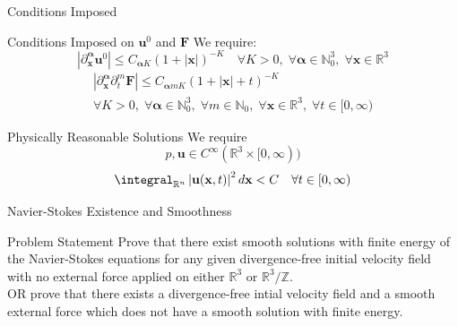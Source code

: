 \documentclass[handout]{beamer}
\newcommand{\Real}{\mathbb{R}}
\newcommand{\Integer}{\mathbb{Z}}
\newcommand{\Natural}{\mathbb{N}}
\begin{document}
  \begin{frame}{Conditions Imposed}
      \linespread{0.8}
      \pause
      \begin{block}{Conditions Imposed on $\mathbf{u}^0$ and $\mathbf{F}$}
          We require:
          $$
          \left| \partial^{\boldsymbol{\alpha}}_{\mathbf{x}} \mathbf{u}^0
          \right| \le
          C_{\boldsymbol{\alpha}K} \left(1 + \left|\mathbf{x}\right|\right)^{-K} \quad
          \forall K > 0, \; \forall \boldsymbol{\alpha} \in \Natural_0^3, \;
          \forall \mathbf{x} \in \Real^3
          $$\pause
          \begin{multline*}
          \left| \partial^{\boldsymbol{\alpha}}_{\mathbf{x}}
          \partial^m_t \mathbf{F}
          \right| \le
          C_{\boldsymbol{\alpha}mK} \left(1 + \left|\mathbf{x}\right| +
          t\right)^{-K} \\
          \forall K > 0, \; \forall \boldsymbol{\alpha} \in \Natural_0^3, \;
          \forall m \in \Natural_0, \; \forall \mathbf{x} \in \Real^3, \;
          \forall t \in [0, \infty)
          \end{multline*}
      \end{block}
      \pause
      \begin{block}{Physically Reasonable Solutions}
          We require
          $$
          p, \mathbf{u} \in C^{\infty}(\Real^3 \times [0, \infty))
          $$
          \pause
          $$
          \integral_{\Real^n} \left| \mathbf{u}(\mathbf{x}, t) \right|^2
          d\mathbf{x} < C \quad \forall t \in [0, \infty)
          $$
      \end{block}
  \end{frame}
  \begin{frame}{Navier-Stokes Existence and Smoothness}
      \begin{block}{Problem Statement}
          Prove that there exist smooth solutions with finite energy of the
          Navier-Stokes equations for any given divergence-free initial
          velocity field with no external force applied on either $\Real^3$
          or $\Real^3/\Integer$.\pause\\
          OR prove that there exists a divergence-free
          intial velocity field and a smooth external force which does not
          have a smooth solution with finite energy.
      \end{block}
  \end{frame}
\end{document}
